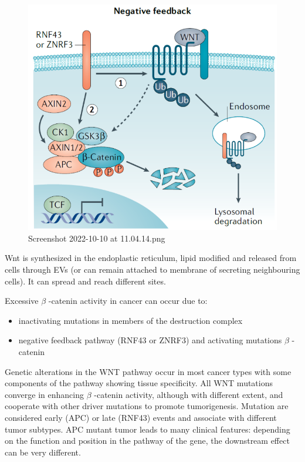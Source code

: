 \begin{figure}
\centering
\includegraphics[width=\textwidth]{../_resources/Screenshot_2022-10-10_at_11-04-14.png}
\caption{Screenshot 2022-10-10 at 11.04.14.png}
\end{figure}

Wnt is synthesized in the endoplastic reticulum, lipid modified and released from cells through EVs (or can remain attached to membrane of secreting neighbouring cells). It can spread and reach different sites.

Excessive $\beta$  -catenin activity in cancer can occur due to:

\begin{itemize}
\tightlist
\item
  inactivating mutations in members of the destruction complex
\item
  negative feedback pathway (RNF43 or ZNRF3) and activating mutations $\beta$  -catenin
\end{itemize}

Genetic alterations in the WNT pathway occur in most cancer types with some components of the pathway showing tissue specificity. All WNT mutations converge in enhancing $\beta$  -catenin activity, although with different extent, and cooperate with other driver mutations to promote tumorigenesis. Mutation are considered early (APC) or late (RNF43) events and associate with different tumor subtypes. APC mutant tumor leads to many clinical features: depending on the function and position in the pathway of the gene, the downstream effect can be very different.

